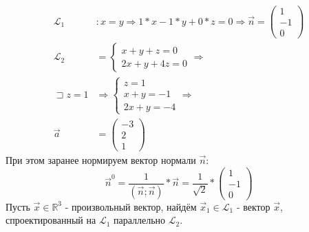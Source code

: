 \documentclass[12pt, a4paper]{article}
\begin{document}
\begin{equation*}
\begin{aligned}
\mathcal{L}_1 &: x=y \Rightarrow 1*x-1*y+0*z=0 \Rightarrow \vec{n} =
\begin{pmatrix}
1\\
-1\\
0
\end{pmatrix}\\
\mathcal{L}_2 &=
\begin{cases}
x+y+z=0\\
2x+y+4z=0
\end{cases} \Rightarrow\\
 \sqsupset z=1 &\Rightarrow
\begin{cases}
z=1\\
x+y=-1\\
2x+y=-4
\end{cases} \Rightarrow\\
\vec{a}&=
\begin{pmatrix}
-3\\
2\\
1
\end{pmatrix}
\end{aligned}
\end{equation*}
При этом заранее нормируем вектор нормали $\vec{n}$:
\begin{equation*}
\vec{n}^0 = \frac{1}{(\vec{n};\vec{n})}*\vec{n} = \frac{1}{\sqrt{2}}* \begin{pmatrix}
1\\
-1\\
0
\end{pmatrix}
\end{equation*}
Пусть $\vec{x}\in \mathbb{R}^3$ - произвольный вектор, найдём $\vec{x}_1 \in \mathcal{L}_1$ - вектор $\vec{x}$, спроектированный на $\mathcal{L}_1$ параллельно $\mathcal{L}_2$.
\end{document}
